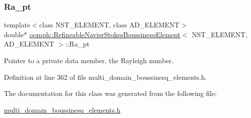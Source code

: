 \subsubsection{\texorpdfstring{Ra\+\_\+pt}{Ra\_pt}}
{\footnotesize\ttfamily template$<$class N\+S\+T\+\_\+\+E\+L\+E\+M\+E\+NT, class A\+D\+\_\+\+E\+L\+E\+M\+E\+NT$>$ \\
double$\ast$ \hyperlink{classoomph_1_1RefineableNavierStokesBoussinesqElement}{oomph\+::\+Refineable\+Navier\+Stokes\+Boussinesq\+Element}$<$ N\+S\+T\+\_\+\+E\+L\+E\+M\+E\+NT, A\+D\+\_\+\+E\+L\+E\+M\+E\+NT $>$\+::Ra\+\_\+pt\hspace{0.3cm}{\ttfamily [private]}}



Pointer to a private data member, the Rayleigh number. 



Definition at line 362 of file multi\+\_\+domain\+\_\+boussinesq\+\_\+elements.\+h.



The documentation for this class was generated from the following file\+:\begin{DoxyCompactItemize}
\item 
\hyperlink{multi__domain__boussinesq__elements_8h}{multi\+\_\+domain\+\_\+boussinesq\+\_\+elements.\+h}\end{DoxyCompactItemize}
